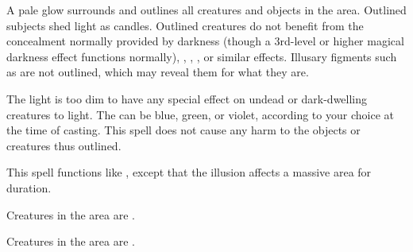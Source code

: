 \begin{comment}
\subsubsection{F}
\end{comment}

\spelldur{\durshort \dismissable}
\begin{spelleffect}
    A pale glow surrounds and outlines all creatures and objects in the area. Outlined subjects shed light as candles. Outlined creatures do not benefit from the concealment normally provided by darkness (though a 3rd-level or higher magical darkness effect functions normally), , , , or similar effects. Illusary figments such as  are not outlined, which may reveal them for what they are.

    The light is too dim to have any special effect on undead or dark-dwelling creatures \vulnerable to light. The  can be blue, green, or violet, according to your choice at the time of casting. This spell does not cause any harm to the objects or creatures thus outlined.
\end{spelleffect}

\spelldur{\durlong \dismissable}
\begin{spelleffect}
    This spell functions like , except that the illusion affects a massive area for \durlong duration.
\end{spelleffect}

\spelldur{\durshort \dismissable}
\begin{spellhealthy}
    Creatures in the area are \shaken.
\end{spellhealthy}
\begin{spellblood}
    Creatures in the area are \frightened.
\end{spellblood}

